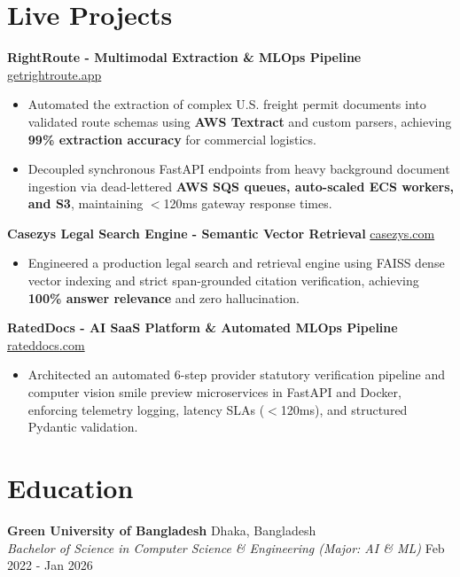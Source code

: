 \documentclass[9.5pt,a4paper]{article}
\begin{document}
\section*{Live Projects}
\noindent
\textbf{RightRoute - Multimodal Extraction & MLOps Pipeline} \hfill \href{https://getrightroute.app}{getrightroute.app}
\begin{itemize}
    \item Automated the extraction of complex U.S. freight permit documents into validated route schemas using \textbf{AWS Textract} and custom parsers, achieving \textbf{99\% extraction accuracy} for commercial logistics.
    \item Decoupled synchronous FastAPI endpoints from heavy background document ingestion via dead-lettered \textbf{AWS SQS queues, auto-scaled ECS workers, and S3}, maintaining $<$120ms gateway response times.
\end{itemize}
\vspace{0.6pt}
\noindent
\textbf{Casezys Legal Search Engine - Semantic Vector Retrieval} \hfill \href{https://casezys.com}{casezys.com}
\begin{itemize}
    \item Engineered a production legal search and retrieval engine using FAISS dense vector indexing and strict span-grounded citation verification, achieving \textbf{100\% answer relevance} and zero hallucination.
\end{itemize}
\vspace{0.6pt}
\noindent
\textbf{RatedDocs - AI SaaS Platform \& Automated MLOps Pipeline} \hfill \href{https://rateddocs.com}{rateddocs.com}
\begin{itemize}
    \item Architected an automated 6-step provider statutory verification pipeline and computer vision smile preview microservices in FastAPI and Docker, enforcing telemetry logging, latency SLAs ($<$120ms), and structured Pydantic validation.
\end{itemize}
\vspace{0.6pt}

\section*{Education}
\noindent
\textbf{Green University of Bangladesh} \hfill Dhaka, Bangladesh\\
\textit{Bachelor of Science in Computer Science \& Engineering (Major: AI \& ML)} \hfill Feb 2022 - Jan 2026
\end{document}
